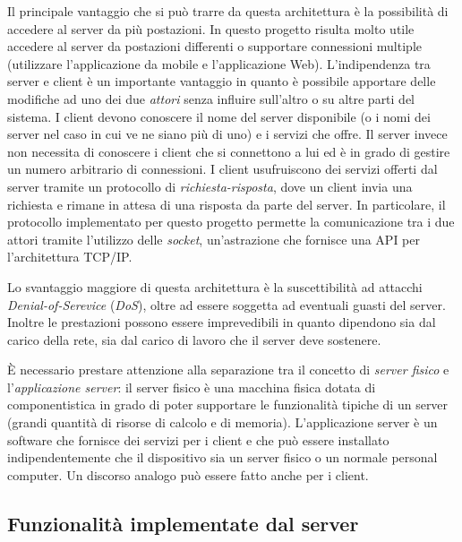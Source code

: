 Il principale vantaggio che si può trarre da questa architettura è la possibilità di accedere al server da più postazioni. In questo progetto risulta molto utile accedere al server da postazioni differenti o supportare connessioni multiple (utilizzare l'applicazione da mobile e l'applicazione Web).
L'indipendenza tra server e client è un importante vantaggio in quanto è possibile apportare delle modifiche ad uno dei due \textit{attori} senza influire sull'altro o su altre parti del sistema. I client devono conoscere il nome del server disponibile (o i nomi dei server nel caso in cui ve ne siano più di uno) e i servizi che offre. Il server invece non necessita di conoscere i client che si connettono a lui ed è in grado di gestire un numero arbitrario di connessioni. I client usufruiscono dei servizi offerti dal server tramite un protocollo di \textit{richiesta-risposta}, dove un client invia una richiesta e rimane in attesa di una risposta da parte del server. In particolare, il protocollo implementato per questo progetto permette la comunicazione tra i due attori tramite l'utilizzo delle \textit{socket}, un'astrazione che fornisce una API per l'architettura TCP/IP.

Lo svantaggio maggiore di questa architettura è la suscettibilità ad attacchi \textit{Denial-of-Serevice} (\textit{DoS}), oltre ad essere soggetta ad eventuali guasti del server. Inoltre le prestazioni possono essere imprevedibili in quanto dipendono sia dal carico della rete, sia dal carico di lavoro che il server deve sostenere.

È necessario prestare attenzione alla separazione tra il concetto di \textit{server fisico} e l'\textit{applicazione server}: il server fisico è una macchina fisica dotata di componentistica in grado di poter supportare le funzionalità tipiche di un server (grandi quantità di risorse di calcolo e di memoria). L'applicazione server è un software che fornisce dei servizi per i client e che può essere installato indipendentemente che il dispositivo sia un server fisico o un normale personal computer. Un discorso analogo può essere fatto anche per i client.

\subsection{Funzionalità implementate dal server}
